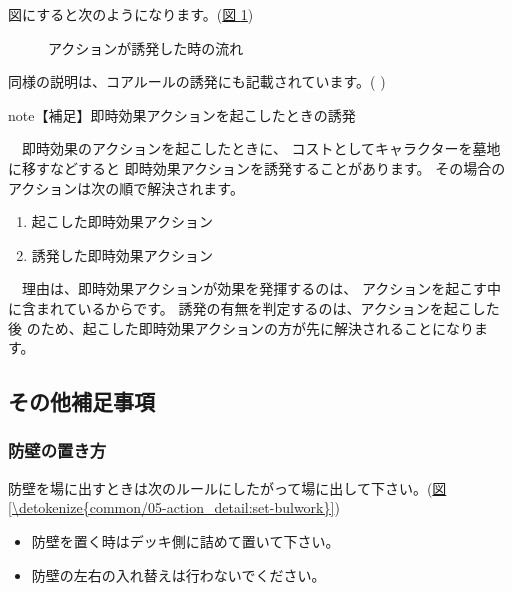 \documentclass[letterpaper,10pt,dvipdfmx]{sphinxmanual}
\begin{document}
図にすると次のようになります。(\hyperref[\detokenize{common/05-action_detail:trigger}]{図 \ref{\detokenize{common/05-action_detail:trigger}}})

\begin{figure}[htbp]
\centering
\capstart

\noindent{}
\caption{アクションが誘発した時の流れ}\label{\detokenize{common/05-action_detail:id17}}\label{\detokenize{common/05-action_detail:trigger}}\end{figure}

同様の説明は、コアルールの誘発にも記載されています。(  )

\begin{sphinxadmonition}{note}{【補足】即時効果アクションを起こしたときの誘発}

　即時効果のアクションを起こしたときに、
コストとしてキャラクターを墓地に移すなどすると
即時効果アクションを誘発することがあります。
その場合のアクションは次の順で解決されます。
\begin{enumerate}
%
\item {} 
起こした即時効果アクション

\item {} 
誘発した即時効果アクション

\end{enumerate}

　理由は、即時効果アクションが効果を発揮するのは、
アクションを起こす中に含まれているからです。
誘発の有無を判定するのは、アクションを起こした後
のため、起こした即時効果アクションの方が先に解決されることになります。
\end{sphinxadmonition}


\subsection{その他補足事項}
\label{\detokenize{common/05-action_detail:id12}}

\subsubsection{防壁の置き方}
\label{\detokenize{common/05-action_detail:id13}}
防壁を場に出すときは次のルールにしたがって場に出して下さい。(\hyperref[\detokenize{common/05-action_detail:set-bulwork}]{図 \ref{\detokenize{common/05-action_detail:set-bulwork}}})
\begin{itemize}
\item {} 
防壁を置く時はデッキ側に詰めて置いて下さい。

\item {} 
防壁の左右の入れ替えは行わないでください。

\end{itemize}
\end{document}
